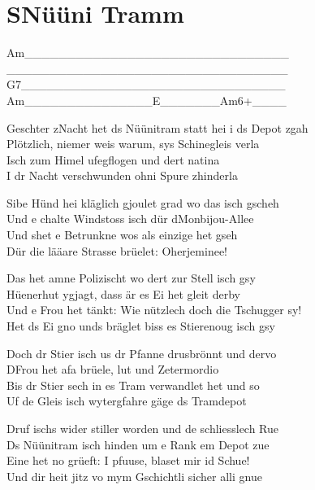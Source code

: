 \documentclass[
  letterpaper,
]{scrbook}
\begin{document}
\hypertarget{snuxfcuxfcni-tramm}{%
\chapter{S\textquotesingle Nüüni Tramm}\label{snuxfcuxfcni-tramm}}

\textbar Am\_\_\_\_\_\_\_\textbar\_\_\_\_\_\_\_\_\textbar\_\_\_\_\_\_\_\_\textbar\_\_\_\_\_\_\_\_\textbar{}\\
\textbar\_\_\_\_\_\_\_\_\_\textbar\_\_\_\_\_\_\_\_\textbar\_\_\_\_\_\_\_\_\textbar\_\_\_\_\_\_\_\_\textbar{}\\
\textbar G7\_\_\_\_\_\_\_\textbar\_\_\_\_\_\_\_\_\textbar\_\_\_\_\_\_\_\_\textbar\_\_\_\_\_\_\_\_\textbar{}\\
\textbar Am\_\_\_\_\_\_\_\textbar\_\_\_\_\_\_\_\_\textbar E\_\_\_\_\_\_\_\textbar Am6+\_\_\_\_\textbar{}

Geschter z\textquotesingle Nacht het ds Nüünitram statt hei i ds Depot
z\textquotesingle gah\\
Plötzlich, niemer weis warum, sys Schinegleis verla\\
Isch zum Himel ufegflogen und dert natina\\
I dr Nacht verschwunden ohni Spure z\textquotesingle hinderla

Sibe Hünd hei kläglich gjoulet grad wo das isch gscheh\\
Und e chalte Windstoss isch dür d\textquotesingle Monbijou-Allee\\
Und s\textquotesingle het e Betrunkne wos als einzige het gseh\\
Dür die lääare Strasse brüelet: Oherjeminee!

Das het amne Polizischt wo dert zur Stell isch gsy\\
Hüenerhut ygjagt, dass är es Ei het gleit derby\\
Und e Frou het tänkt: Wie nützlech doch die Tschugger sy!\\
Het ds Ei gno und\textquotesingle s bräglet bis\textquotesingle s es
Stierenoug isch gsy

Doch dr Stier isch us dr Pfanne drusbrönnt und dervo\\
D\textquotesingle Frou het afa brüele, lut und Zetermordio\\
Bis dr Stier sech in es Tram verwandlet het und so\\
Uf de Gleis isch wytergfahre gäge ds Tramdepot

Druf ischs wider stiller worden und de schliesslech Rue\\
Ds Nüünitram isch hinden um e Rank em Depot zue\\
Eine het no grüeft: I pfuuse, blaset mir id Schue!\\
Und dir heit jitz vo mym Gschichtli sicher alli gnue
\end{document}
